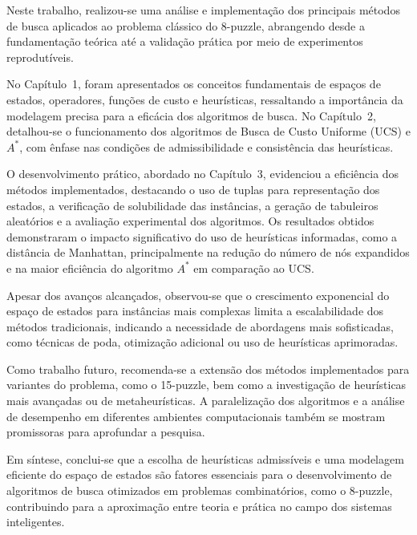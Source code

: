   
Neste trabalho, realizou-se uma análise e implementação dos principais métodos de busca aplicados ao problema clássico do 8-puzzle, abrangendo desde a fundamentação teórica até a validação prática por meio de experimentos reprodutíveis.  
  
No Capítulo~1, foram apresentados os conceitos fundamentais de espaços de estados, operadores, funções de custo e heurísticas, ressaltando a importância da modelagem precisa para a eficácia dos algoritmos de busca. No Capítulo~2, detalhou-se o funcionamento dos algoritmos de Busca de Custo Uniforme (UCS) e $A^*$, com ênfase nas condições de admissibilidade e consistência das heurísticas.  
  
O desenvolvimento prático, abordado no Capítulo~3, evidenciou a eficiência dos métodos implementados, destacando o uso de tuplas para representação dos estados, a verificação de solubilidade das instâncias, a geração de tabuleiros aleatórios e a avaliação experimental dos algoritmos. Os resultados obtidos demonstraram o impacto significativo do uso de heurísticas informadas, como a distância de Manhattan, principalmente na redução do número de nós expandidos e na maior eficiência do algoritmo $A^*$ em comparação ao UCS.  
  
Apesar dos avanços alcançados, observou-se que o crescimento exponencial do espaço de estados para instâncias mais complexas limita a escalabilidade dos métodos tradicionais, indicando a necessidade de abordagens mais sofisticadas, como técnicas de poda, otimização adicional ou uso de heurísticas aprimoradas.  
  
Como trabalho futuro, recomenda-se a extensão dos métodos implementados para variantes do problema, como o 15-puzzle, bem como a investigação de heurísticas mais avançadas ou de metaheurísticas. A paralelização dos algoritmos e a análise de desempenho em diferentes ambientes computacionais também se mostram promissoras para aprofundar a pesquisa.  
  
Em síntese, conclui-se que a escolha de heurísticas admissíveis e uma modelagem eficiente do espaço de estados são fatores essenciais para o desenvolvimento de algoritmos de busca otimizados em problemas combinatórios, como o 8-puzzle, contribuindo para a aproximação entre teoria e prática no campo dos sistemas inteligentes.  
  

